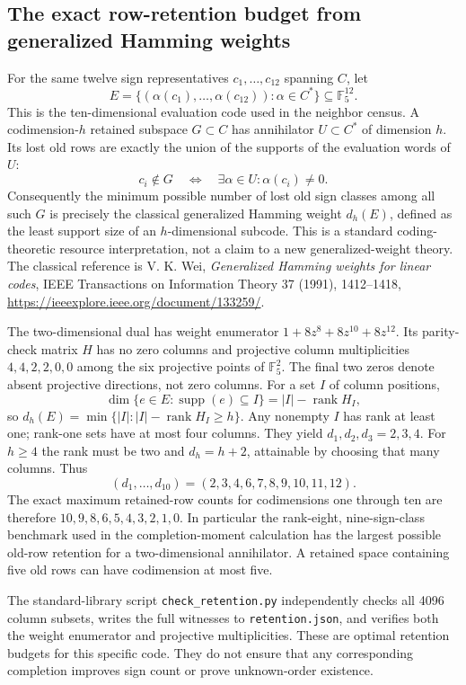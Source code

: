 \subsection{The exact row-retention budget from generalized Hamming weights}
For the same twelve sign representatives $c_1,\ldots,c_{12}$ spanning
$C$, let
\[
 E=\{(\alpha(c_1),\ldots,\alpha(c_{12})): \alpha\in C^*\}
 \subseteq\mathbb F_5^{12}.
\]
This is the ten-dimensional evaluation code used in the neighbor
census. A codimension-$h$ retained subspace $G\subset C$ has
annihilator $U\subset C^*$ of dimension $h$. Its lost old rows are
exactly the union of the supports of the evaluation words of $U$:
\[
 c_i\notin G\quad\Longleftrightarrow\quad
 \exists\alpha\in U:\alpha(c_i)\ne0.
\]
Consequently the minimum possible number of lost old sign classes
among all such $G$ is precisely the classical generalized Hamming
weight $d_h(E)$, defined as the least support size of an
$h$-dimensional subcode. This is a standard coding-theoretic resource
interpretation, not a claim to a new generalized-weight theory.
The classical reference is V. K. Wei, \emph{Generalized Hamming weights
for linear codes}, IEEE Transactions on Information Theory 37 (1991),
1412--1418, \url{https://ieeexplore.ieee.org/document/133259/}.

The two-dimensional dual has weight enumerator
$1+8z^8+8z^{10}+8z^{12}$. Its parity-check matrix $H$ has no zero
columns and projective column multiplicities $4,4,2,2,0,0$ among
the six projective points of $\mathbb F_5^2$. The final two zeros
denote absent projective directions, not zero columns. For a set
$I$ of column positions,
\[
 \dim\{e\in E:\operatorname{supp}(e)\subseteq I\}
 =|I|-\operatorname{rank}H_I,
\]
so $d_h(E)=\min\{|I|:|I|-\operatorname{rank}H_I\ge h\}$.
Any nonempty $I$ has rank at least one; rank-one sets have at most
four columns. They yield $d_1,d_2,d_3=2,3,4$. For $h\ge4$ the
rank must be two and $d_h=h+2$, attainable by choosing that many
columns. Thus
\[
 (d_1,\ldots,d_{10})=(2,3,4,6,7,8,9,10,11,12).
\]
The exact maximum retained-row counts for codimensions one through
ten are therefore $10,9,8,6,5,4,3,2,1,0$.
In particular the rank-eight, nine-sign-class benchmark used in the
completion-moment calculation has the largest possible old-row
retention for a two-dimensional annihilator. A retained space
containing five old rows can have codimension at most five.

The standard-library script \texttt{check\_retention.py} independently
checks all 4096 column subsets, writes the full witnesses to
\texttt{retention.json}, and verifies both the weight enumerator and
projective multiplicities. These are optimal retention budgets for
this specific code. They do not ensure that any corresponding
completion improves sign count or prove unknown-order existence.
